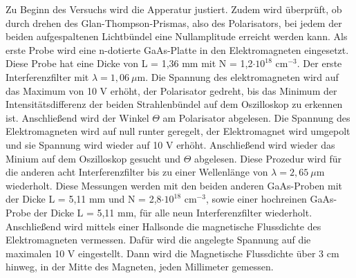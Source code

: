 Zu Beginn des Versuchs wird die Apperatur justiert. Zudem wird überprüft, ob durch drehen des Glan-Thompson-Prismas, 
also des Polarisators, bei jedem der beiden aufgespaltenen Lichtbündel eine Nullamplitude erreicht werden kann. 
Als erste Probe wird eine n-dotierte GaAs-Platte in den Elektromagneten eingesetzt. 
Diese Probe hat eine Dicke von L = 1,36 mm mit N = 1,2$\cdot 10^{18}$ cm$^{-3}$. Der erste Interferenzfilter 
mit $\lambda = 1,06 \: \mu$m. Die Spannung des elektromagneten wird auf das Maximum von 10 V erhöht, 
der Polarisator gedreht, bis das Minimum der Intensitätsdifferenz der beiden Strahlenbündel auf dem Oszilloskop 
zu erkennen ist. Anschließend wird der Winkel $\Theta$ am Polarisator abgelesen.
Die Spannung des Elektromagneten wird auf null runter geregelt, der Elektromagnet wird umgepolt 
und sie Spannung wird wieder auf 10 V erhöht. Anschließend wird wieder das Minium auf dem Oszilloskop gesucht und 
$\Theta$ abgelesen. Diese Prozedur wird für die anderen acht Interferenzfilter bis zu einer Wellenlänge 
von $\lambda = 2,65 \: \mu$m wiederholt.
Diese Messungen werden mit den beiden anderen GaAs-Proben mit der Dicke L = 5,11 mm und N = 2,8$\cdot 10^{18}$ cm$^{-3}$, 
sowie einer hochreinen GaAs-Probe der Dicke L = 5,11 mm, für alle neun Interferenzfilter wiederholt.
Anschließend wird mittels einer Hallsonde die magnetische Flussdichte des Elektromagneten vermessen. 
Dafür wird die angelegte Spannung auf die maximalen 10 V eingestellt. 
Dann wird die Magnetische Flussdichte über 3 cm hinweg, in der Mitte des Magneten, jeden Millimeter gemessen.

